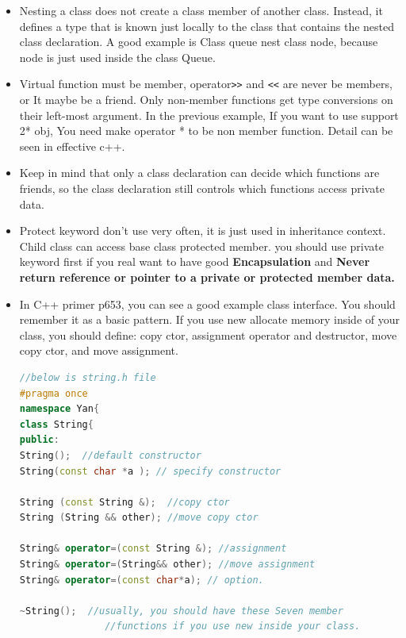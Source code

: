 \documentclass[a4paper,12pt,twoside]{book}
\begin{document}
\begin{itemize}

\item Nesting a class does not create a class member of another class. Instead, it defines a type that is known just locally to the class that contains the nested class declaration.  A good example is Class queue nest class node,  because node is just used inside the class Queue.

\item Virtual function must be member, operator\verb=>>= and \verb=<<= are never be members, or It maybe be a friend. Only non-member functions get type conversions on their left-most argument.  In the previous example, If you want to use support 2* obj, You need make operator * to be non member function.  Detail can be seen in effective c++.

 \item Keep in mind that only a class declaration can decide which functions are friends, so the class declaration still controls which functions access private data.

 \item Protect keyword don't use very often, it is just used in inheritance context. Child class can access base class protected member. you should use private keyword first if you real want to have good \textbf{Encapsulation} and \textbf{Never return reference or pointer to a private or protected member data.}

\item In C++ primer p653, you can see a good example class interface. You should remember it as a basic pattern.  If you use new allocate memory inside of your class, you should define: copy ctor, assignment operator and destructor, move copy ctor, and move assignment.

\begin{lstlisting}[frame=single, language=c++]
//below is string.h file
#pragma once
namespace Yan{
class String{
public:
String();  //default constructor
String(const char *a ); // specify constructor

String (const String &);  //copy ctor
String (String && other); //move copy ctor

String& operator=(const String &); //assignment
String& operator=(String&& other); //move assignment
String& operator=(const char*a); // option.

~String();  //usually, you should have these Seven member
               //functions if you use new inside your class.


\end{lstlisting}
\end{itemize}
\end{document}
